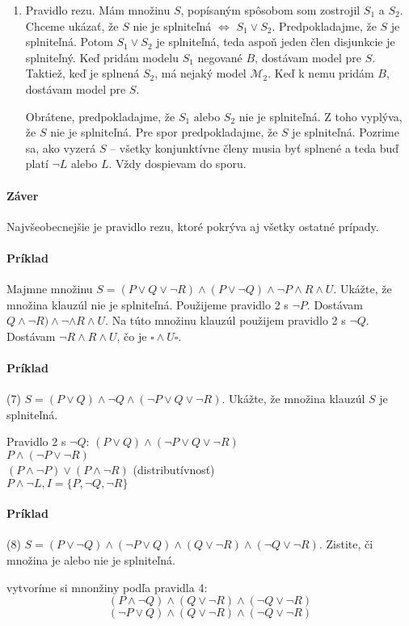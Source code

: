\begin{enumerate}
	\item Pravidlo rezu. Mám množinu $S$, popísaným spôsobom som zostrojil
	$S_1$ a $S_2$. Chceme ukázať, že $S$ nie je splniteľná $\iff$ $S_1 \lor
	S_2$. Predpokladajme, že $S$ je splniteľná. Potom $S_1 \lor S_2$ je
	splniteľná, teda aspoň jeden člen disjunkcie je splniteľný. Keď pridám
	modelu $S_1$ negované $B$, dostávam model pre $S$. Taktiež, keď je
	splnená $S_2$, má nejaký model $\mathcal{M_2}$. Keď k nemu pridám $B$,
	dostávam model pre $S$.

	\par Obrátene, predpokladajme, že $S_1$ alebo $S_2$ nie je splniteľná. Z
	toho vyplýva, že $S$ nie je splniteľná. Pre spor predpokladajme, že $S$
	je splniteľná. Pozrime sa, ako vyzerá $S$ -- všetky konjunktívne členy
	musia byť splnené a teda buď platí $\neg L$ alebo $L$. Vždy dospievam do
	sporu.
\end{enumerate}

\paragraph{Záver} Najvšeobecnejšie je pravidlo rezu, ktoré pokrýva aj všetky
ostatné prípady.

\paragraph{Príklad} Majmne množinu $S=(P \lor Q \lor \neg R) \land (P \lor \neg
Q) \land \neg P \land R \land U$. Ukážte, že množina klauzúl nie je splniteľná.
Použijeme pravidlo 2 s $\neg P$. Dostávam $Q\land\neg R) \land \neg  \land R
\land U$. Na túto množinu klauzúl použijem pravidlo 2 s $\neg Q$. Dostávam $\neg
R \land R \land U$, čo je $\square \land U \square$.




\paragraph{Príklad} (7) $S=(P \lor Q) \land \neg Q \land ( \neg P \lor Q \lor \neg
R)$. Ukážte, že množina klauzúl $S$ je splniteľná.
\par Pravidlo 2 s $\neg Q$: $(P \lor Q) \land ( \neg P \lor Q \lor \neg R)$ \\
$P \land (\neg P \lor \neg R)$ \\
$(P \land \neg P) \lor (P \land \neg R)$ (distributívnosť) \\
$P \land \neg L, I=\{P,\neg Q, \neg R\}$

\paragraph{Príklad} (8) $S=(P\lor \neg Q) \land (\neg P \lor Q) \land (Q \lor
\neg R) \land (\neg Q \lor \neg R)$. Zistite, či množina je alebo nie je
splniteľná.
\par vytvoríme si mnonžiny podľa pravidla 4: \\
$$(P\land \neg Q) \land (Q \lor \neg R)  \land (\neg Q \lor \neg R)$$
$$(\neg P \lor Q) \land (Q \lor \neg R) \land (\neg Q \lor \neg R)$$

